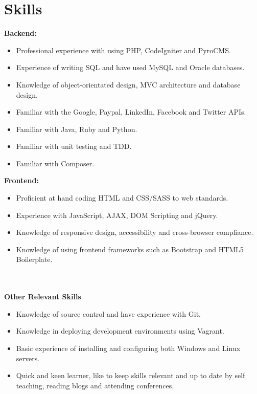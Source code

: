 \documentclass[11pt,a4paper,sans]{moderncv}
\begin{document}
\makecvtitle

\section{Skills}

\begin{minipage}[t]{0.45\textwidth}
	\textbf{Backend:}
	\begin{itemize}
		\item Professional experience with using PHP, CodeIgniter and PyroCMS. 
		\item Experience of writing SQL and have used MySQL and Oracle databases.
		\item Knowledge of object-orientated design, MVC architecture and database design.
		\item Familiar with the Google, Paypal, LinkedIn, Facebook and Twitter APIs.
		\item Familiar with Java, Ruby and Python.
		\item Familiar with unit testing and TDD.
		\item Familiar with Composer.
	\end{itemize}
\end{minipage}
\begin{minipage}[t]{0.45\textwidth}
	\textbf{Frontend:}
	\begin{itemize}
		\item Proficient at hand coding HTML and CSS/SASS to web standards.
		\item Experience with JavaScript, AJAX, DOM Scripting and jQuery.
		\item Knowledge of responsive design, accessibility and cross-browser compliance.
		\item Knowledge of using frontend frameworks such as Bootstrap and HTML5 Boilerplate.
	\end{itemize}
\end{minipage}
\\\\
\textbf{Other Relevant Skills}
\begin{itemize}
	\item Knowledge of source control and have experience with Git.
	\item Knowledge in deploying development environments using Vagrant.
	\item Basic experience of installing and configuring both Windows and Linux servers.
	\item Quick and keen learner, like to keep skills relevant and up to date by self teaching, reading blogs and attending conferences.  
\end{itemize}
\end{document}
